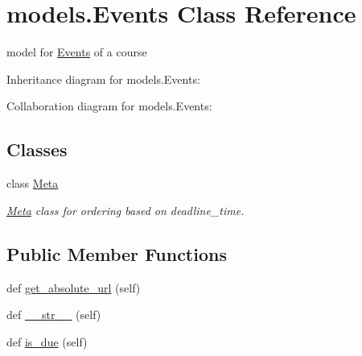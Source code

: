 \hypertarget{classmodels_1_1_events}{}\section{models.\+Events Class Reference}
\label{classmodels_1_1_events}


model for \hyperlink{classmodels_1_1_events}{Events} of a course  




Inheritance diagram for models.\+Events\+:


Collaboration diagram for models.\+Events\+:
\subsection*{Classes}
\begin{DoxyCompactItemize}
\item 
class \hyperlink{classmodels_1_1_events_1_1_meta}{Meta}
\begin{DoxyCompactList}\small\item\em \hyperlink{classmodels_1_1_events_1_1_meta}{Meta} class for ordering based on deadline\+\_\+time. \end{DoxyCompactList}\end{DoxyCompactItemize}
\subsection*{Public Member Functions}
\begin{DoxyCompactItemize}
\item 
def \hyperlink{classmodels_1_1_events_a58dfd43e6d72760608ff5404201666e0}{get\+\_\+absolute\+\_\+url} (self)
\item 
def \hyperlink{classmodels_1_1_events_af85d4f84ac610bb82415c8b4dd493970}{\+\_\+\+\_\+str\+\_\+\+\_\+} (self)
\item 
def \hyperlink{classmodels_1_1_events_afd74f38f5189c12fbd4c98c0f4b2ec1a}{is\+\_\+due} (self)
\end{DoxyCompactItemize}
